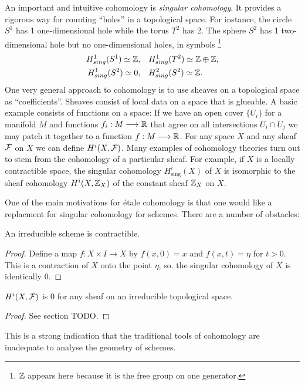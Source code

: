 An important and intuitive cohomology is \textit{singular cohomology}. It provides a rigorous way for counting ``holes'' in a topological space.  For instance, the circle $S^1$ has 1 one-dimensional hole while the torus $T^2$ has 2. The sphere $S^2$ has 1 two-dimensional hole but no one-dimensional holes, in symbols 
\footnote{$\mathbb{Z}$ appears here because it is the free group on one generator.}
\begin{align*}
  H^1_{sing}(S^1) \simeq \mathbb{Z},\quad &H^1_{sing}(T^2) \simeq \mathbb{Z} \oplus \mathbb{Z},\\
  H^1_{sing}(S^2) \simeq  0,\quad &H^2_{sing}(S^2) \simeq \mathbb{Z}.
\end{align*}
One very general approach to cohomology is to use sheaves on a topological space as ``coefficients''. Sheaves consist of local data on a space that is glueable. A basic example consists of functions on a space: If we have an open cover $\{ U_i\}$ for a manifold $M$ and functions $f_i: M \longrightarrow \mathbb{R}$ that agree on all intersections $U_i \cap U_j$ we may patch it together to a function $f: M \longrightarrow \mathbb{R}$.
 For any space $X$ and any sheaf $\mathcal{F}$ on $X$ we can define $H^i(X, \mathcal{F})$. Many examples of cohomology theories turn out to stem from the cohomology of a particular sheaf. For example, if $X$ is a locally contractible space, the singular cohomology $H_{\text{sing}}^i(X)$ of $X$ is isomorphic to the sheaf cohomology $H^i(X, \mathbb{Z}_X)$ of the constant sheaf $\mathbb{Z}_X$ on $X$.

One of the main motivations for \'etale cohomology is that one would like a replacment for singular cohomology for schemes. There are a number of obstacles:
\begin{proposition}\label{scheme_contractible}
    An irreducible scheme is contractible.
\end{proposition}
\begin{proof}
  Define a map $f: X \times I \to X$  by $f(x,0) = x$ and $f(x,t) = \eta$ for $t > 0$. This is a contraction of $X$ onto the point $\eta$, so. the singular cohomology of $X$ is identically 0.
\end{proof}

\begin{proposition}
  $H^i(X, \mathcal{F})$ is 0 for any sheaf on an irreducible topological space.
\end{proposition}
\begin{proof}
    See section TODO.
\end{proof}
This is a strong indication that the traditional tools of cohomology are inadequate to analyse the geometry of schemes.


